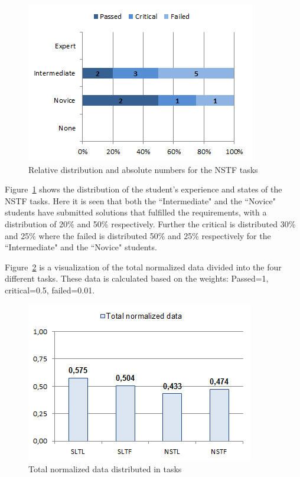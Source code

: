 \documentclass{sig-alternate-05-2015}
\begin{document}
\begin{figure}[!ht]
	\centering
	\includegraphics[width=1\linewidth]{img09}
	\caption{Relative distribution and absolute numbers for the NSTF tasks}
	\label{fig:NSTF percentage distributions with relative task numbers}
\end{figure}

Figure~\ref{fig:NSTF percentage distributions with relative task numbers} shows the distribution of the student's experience and states of the NSTF tasks. Here it is seen that both the ``Intermediate" and the ``Novice" students have submitted solutions that fulfilled the requirements, with a distribution of 20\% and 50\% respectively. Further the critical is distributed 30\% and 25\% where the failed is distributed 50\% and 25\% respectively for the ``Intermediate" and the ``Novice" students.

Figure~\ref{fig:Total normalized data distributed in tasks} is a visualization of the total normalized data divided into the four different tasks. These data is calculated based on the weights: Passed=1, critical=0.5, failed=0.01. %

\begin{figure}[!ht]
	\centering
	\includegraphics[width=1\linewidth]{img10}
	\caption{Total normalized data distributed in tasks}
	\label{fig:Total normalized data distributed in tasks}
\end{figure}
\end{document}
